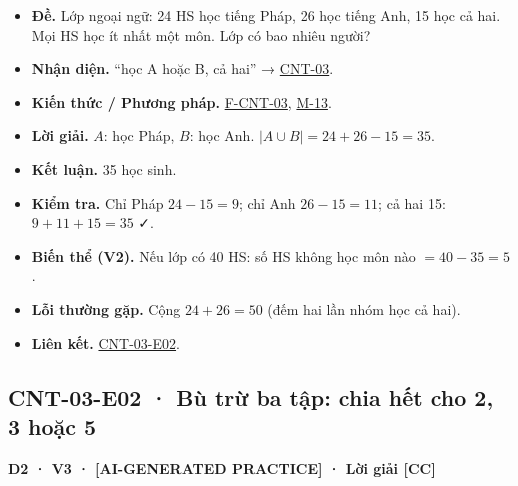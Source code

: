 \documentclass[
  10pt,
  twoside,openany]{book}
\providecommand{\tightlist}{%
  \setlength{\itemsep}{0pt}\setlength{\parskip}{0pt}}
\begin{document}
\begin{itemize}
\tightlist
\item
  \textbf{Đề.} Lớp ngoại ngữ: 24 HS học tiếng Pháp, 26 học tiếng Anh, 15
  học cả hai. Mọi HS học ít nhất một môn. Lớp có bao nhiêu người?
\item
  \textbf{Nhận diện.} ``học A hoặc B, cả hai'' →
  \protect\hyperlink{CNT-03}{CNT-03}.
\item
  \textbf{Kiến thức / Phương pháp.}
  \protect\hyperlink{F-CNT-03}{F-CNT-03},
  \protect\hyperlink{M-13}{M-13}.
\item
  \textbf{Lời giải.} \(A\): học Pháp, \(B\): học Anh.
  \(|A\cup B|=24+26-15=35\).
\item
  \textbf{Kết luận.} 35 học sinh.
\item
  \textbf{Kiểm tra.} Chỉ Pháp \(24-15=9\); chỉ Anh \(26-15=11\); cả hai
  15: \(9+11+15=35\) ✓.
\item
  \textbf{Biến thể (V2).} Nếu lớp có 40 HS: số HS không học môn nào
  \(=40-35=5\).
\item
  \textbf{Lỗi thường gặp.} Cộng \(24+26=50\) (đếm hai lần nhóm học cả
  hai).
\item
  \textbf{Liên kết.} \protect\hyperlink{CNT-03-E02}{CNT-03-E02}.
\end{itemize}

\hypertarget{CNT-03-E02}{%
\subsection{CNT-03-E02 · Bù trừ ba tập: chia hết cho 2, 3 hoặc
5}\label{CNT-03-E02}}

\textbf{D2 · V3 · {[}AI-GENERATED PRACTICE{]} · Lời giải {[}CC{]}}
\end{document}
